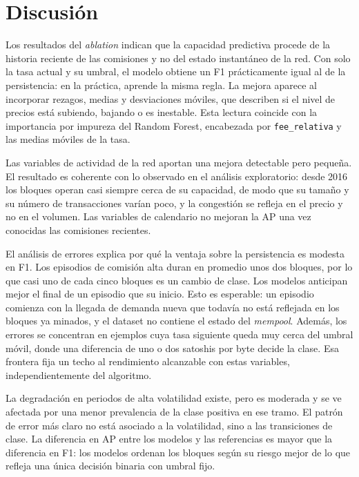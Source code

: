 \section{Discusión}
Los resultados del \textit{ablation} indican que la capacidad predictiva procede de la historia reciente de las comisiones y no del estado instantáneo de la red. Con solo la tasa actual y su umbral, el modelo obtiene un F1 prácticamente igual al de la persistencia: en la práctica, aprende la misma regla. La mejora aparece al incorporar rezagos, medias y desviaciones móviles, que describen si el nivel de precios está subiendo, bajando o es inestable. Esta lectura coincide con la importancia por impureza del Random Forest, encabezada por \texttt{fee\_relativa} y las medias móviles de la tasa.

Las variables de actividad de la red aportan una mejora detectable pero pequeña. El resultado es coherente con lo observado en el análisis exploratorio: desde 2016 los bloques operan casi siempre cerca de su capacidad, de modo que su tamaño y su número de transacciones varían poco, y la congestión se refleja en el precio y no en el volumen. Las variables de calendario no mejoran la AP una vez conocidas las comisiones recientes.

El análisis de errores explica por qué la ventaja sobre la persistencia es modesta en F1. Los episodios de comisión alta duran en promedio unos dos bloques, por lo que casi uno de cada cinco bloques es un cambio de clase. Los modelos anticipan mejor el final de un episodio que su inicio. Esto es esperable: un episodio comienza con la llegada de demanda nueva que todavía no está reflejada en los bloques ya minados, y el dataset no contiene el estado del \textit{mempool}. Además, los errores se concentran en ejemplos cuya tasa siguiente queda muy cerca del umbral móvil, donde una diferencia de uno o dos satoshis por byte decide la clase. Esa frontera fija un techo al rendimiento alcanzable con estas variables, independientemente del algoritmo.

La degradación en periodos de alta volatilidad existe, pero es moderada y se ve afectada por una menor prevalencia de la clase positiva en ese tramo. El patrón de error más claro no está asociado a la volatilidad, sino a las transiciones de clase. La diferencia en AP entre los modelos y las referencias es mayor que la diferencia en F1: los modelos ordenan los bloques según su riesgo mejor de lo que refleja una única decisión binaria con umbral fijo.

